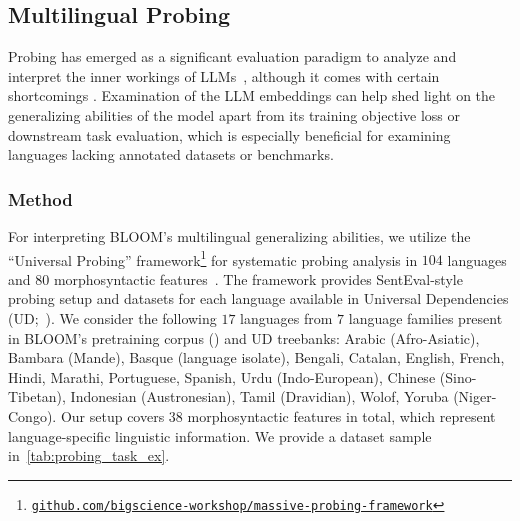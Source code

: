 \documentclass[twoside,11pt]{article}
\begin{document}
\subsection{Multilingual Probing}
\label{sec:eval:probing}
Probing has emerged as a significant evaluation paradigm to analyze and interpret the inner workings of LLMs~\citep{ettinger-etal-2016-probing,adi:2017:ICLR,belinkov-etal-2017-neural,hupkes2018visualisation,tenney2018you,belinkov-glass-2019-analysis,teehan-etal-2022-emergent}, although it comes with certain shortcomings \citep{belinkov-2022-probing}. Examination of the LLM embeddings can help shed light on the generalizing abilities of the model apart from its training objective loss or downstream task evaluation, which is especially beneficial for examining languages lacking annotated datasets or benchmarks.

\subsubsection{Method}
\label{subsec:eval:probing}
For interpreting BLOOM's multilingual generalizing abilities, we utilize the ``Universal Probing'' framework\footnote{\href{https://github.com/bigscience-workshop/massive-probing-framework}{\texttt{github.com/bigscience-workshop/massive-probing-framework}}} for systematic probing analysis in $104$ languages and $80$ morphosyntactic features~\citep{serikov2022universal}. The framework provides SentEval-style~\citep{conneau-etal-2018-cram} probing setup and datasets for each language available in Universal Dependencies (UD;~\citealp{nivre-etal-2016-universal}). We consider the following $17$ languages from $7$ language families present in BLOOM's pretraining corpus () and UD treebanks: Arabic (Afro-Asiatic), Bambara (Mande), Basque (language isolate), Bengali, Catalan, English, French, Hindi, Marathi, Portuguese, Spanish, Urdu (Indo-European), Chinese (Sino-Tibetan), Indonesian (Austronesian), Tamil (Dravidian), Wolof, Yoruba (Niger-Congo). Our setup covers $38$ morphosyntactic features in total, which represent language-specific linguistic information. We provide a dataset sample in~\autoref{tab:probing_task_ex}.
\end{document}
